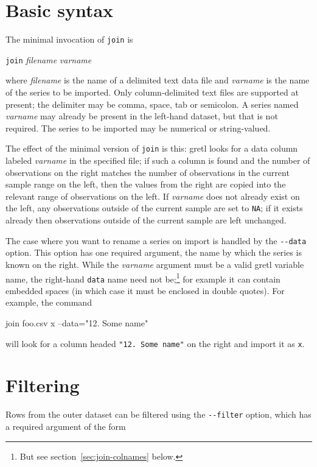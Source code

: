 \section{Basic syntax}
\label{sec:join-syntax}

The minimal invocation of \texttt{join} is

\qquad \texttt{join} \textsl{filename} \textsl{varname}

where \textsl{filename} is the name of a delimited text data file and
\textsl{varname} is the name of the series to be imported. Only
column-delimited text files are supported at present; the delimiter
may be comma, space, tab or semicolon. A series named \textsl{varname}
may already be present in the left-hand dataset, but that is not
required. The series to be imported may be numerical or string-valued.

The effect of the minimal version of \texttt{join} is this: gretl
looks for a data column labeled \textsl{varname} in the specified
file; if such a column is found and the number of observations on the
right matches the number of observations in the current sample range
on the left, then the values from the right are copied into the
relevant range of observations on the left. If \textsl{varname} does
not already exist on the left, any observations outside of the current
sample are set to \texttt{NA}; if it exists already then observations
outside of the current sample are left unchanged.

The case where you want to rename a series on import is handled by the
\verb|--data| option. This option has one required argument, the name
by which the series is known on the right. While the \textsl{varname}
argument must be a valid gretl variable name, the right-hand
\texttt{data} name need not be;\footnote{But see
  section~\ref{sec:join-colnames} below.} for example it can contain
embedded spaces (in which case it must be enclosed in double
quotes). For example, the command
%
\begin{code}
join foo.csv x --data="12. Some name"
\end{code}
%
will look for a column headed \verb|"12. Some name"| on the right and
import it as \texttt{x}.

\section{Filtering}

Rows from the outer dataset can be filtered using the \verb|--filter|
option, which has a required argument of the form

